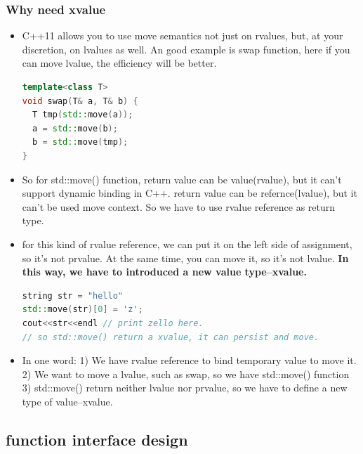 \documentclass[a4paper,12pt,twoside]{book}
\begin{document}
\subsubsection{Why need xvalue}
\begin{itemize}

\item C++11 allows you to use move semantics not just on rvalues, but, at your discretion, on lvalues as well. An good example is swap function, here if you can move lvalue, the efficiency will be better. 
\begin{lstlisting}[frame=single, language=c++, mathescape=true]
template<class T> 
void swap(T& a, T& b) { 
  T tmp(std::move(a));
  a = std::move(b); 
  b = std::move(tmp);
} 
\end{lstlisting}

\item So for std::move() function, return value can be value(rvalue), but it can't support dynamic binding in C++.  return value can be refernce(lvalue), but it can't be used move context. So we have to use rvalue reference as return type. 

\item for this kind of rvalue reference, we can put it on the left side of assignment, so it's not prvalue. At the same time, you can move it, so it's not lvalue.  \textbf{In this way, we have to introduced a new value type--xvalue.}    
\begin{lstlisting}[frame=single, language=c++, mathescape=true]
string str = "hello"
std::move(str)[0] = 'z';
cout<<str<<endl // print zello here.
// so std::move() return a xvalue, it can persist and move.
\end{lstlisting}

\item In one word: 1) We have rvalue reference to bind temporary value to move it. 2) We want to move a lvalue, such as swap, so we have std::move() function 3) std::move() return neither lvalue nor prvalue, so we have to define a new type of value--xvalue. 

\end{itemize}




\subsection{function interface design}
\end{document}
